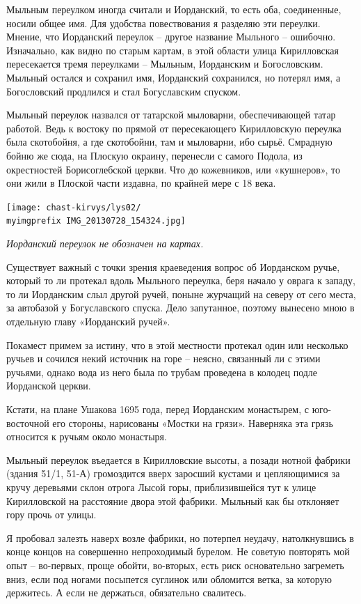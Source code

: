 Мыльным переулком иногда считали и Иорданский, то есть оба, соединенные, носили общее имя. Для удобства повествования я разделяю эти переулки. Мнение, что Иорданский переулок – другое название Мыльного – ошибочно. Изначально, как видно по старым картам, в этой области улица Кирилловская пересекается тремя переулками – Мыльным, Иорданским и Богословским. Мыльный остался и сохранил имя, Иорданский сохранился, но потерял имя, а Богословский продлился и стал Богуславским спуском.

Мыльный переулок назвался от татарской мыловарни, обеспечивающей татар работой. Ведь к востоку по прямой от пересекающего Кирилловскую переулка была скотобойня, а где скотобойни, там и мыловарни, ибо сырьё. Смрадную бойню же сюда, на Плоскую окраину, перенесли с самого Подола, из окрестностей Борисоглебской церкви. Что до кожевников, или «кушнеров», то они жили в Плоской части издавна, по крайней мере с 18 века.

\begin{center}
\texttt{[image: chast-kirvys/lys02/\\myimgprefix IMG\_20130728\_154324.jpg]}

\textit{Иорданский переулок не обозначен на картах.}
\end{center}

Существует важный с точки зрения краеведения вопрос об Иорданском ручье, который то ли протекал вдоль Мыльного переулка, беря начало у оврага к западу, то ли Иорданским слыл другой ручей, поныне журчащий на северу от сего места, за автобазой у Богуславского спуска. Дело запутанное, поэтому вынесено мною в отдельную главу «Иорданский ручей».

Покамест примем за истину, что в этой местности протекал один или несколько ручьев и сочился некий источник на горе – неясно, связанный ли с этими ручьями, однако вода из него была по трубам проведена в колодец подле Иорданской церкви.

Кстати, на плане Ушакова 1695 года, перед Иорданским монастырем, с юго-восточной его стороны, нарисованы «Мостки на грязи». Наверняка эта грязь относится к ручьям около монастыря.

Мыльный переулок въедается в Кирилловские высоты, а позади нотной фабрики (здания 51/1, 51-А) громоздится вверх заросший кустами и цепляющимися за кручу деревьями склон отрога Лысой горы, приблизившейся тут к улице Кирилловской на расстояние двора этой фабрики. Мыльный как бы отклоняет гору прочь от улицы. 

Я пробовал залезть наверх возле фабрики, но потерпел неудачу, натолкнувшись в конце концов на совершенно непроходимый бурелом. Не советую повторять мой опыт – во-первых, проще обойти, во-вторых, есть риск основательно загреметь вниз, если под ногами посыпется суглинок или обломится ветка, за которую держитесь. А если не держаться, обязательно свалитесь.


